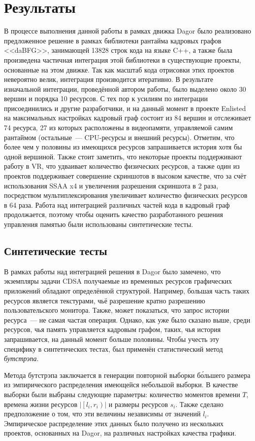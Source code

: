 \section{Результаты}
В процессе выполнения данной работы в рамках движка Dagor было реализовано предложенное решение в рамках библиотеки рантайма кадровых графов <<daBFG>>, занимающей 13828 строк кода на языке C++, а также была произведена частичная интеграция этой библиотеки в существующие проекты, основанные на этом движке.
Так как масштаб кода отрисовки этих проектов невероятно велик, интеграция производится итеративно.
В результате изначальной интеграции, проведённой автором работы, было выделено около 30 вершин и порядка 10 ресурсов.
С тех пор к усилиям по интеграции присоединились и другие разработчики, и на данный момент в проекте Enlisted на максимальных настройках кадровый граф состоит из 84 вершин и отслеживает 74 ресурса, 27 из которых расположены в видеопамяти, управляемой самим рантаймом (остальные~--- CPU-ресурсы и внешний ресурсы).
Отметим, что более чем у половины из имеющихся ресурсов запрашивается история хотя бы одной вершиной.
Также стоит заметить, что некоторые проекты поддерживают работу в VR, что удваивает количество физических ресурсов, а также один из проектов поддерживает совершение скриншотов в высоком качестве, что за счёт использования SSAA x4 и увеличения разрешения скриншота в 2 раза, посредством мультиплексирования увеличивает количество физических ресурсов в 64 раза.
Работа над интеграцией различных частей кода в кадровый граф продолжается, поэтому чтобы оценить качество разработанного решения управления памятью были использованы синтетические тесты.

\subsection{Синтетические тесты}
В рамках работы над интеграцией решения в Dagor было замечено, что экземпляры задачи CDSA получаемые из временных ресурсов графических приложений обладают определённой структурой.
Например, большая часть таких ресурсов является текстурами, чьё разрешение кратно разрешению пользовательского монитора.
Также, может показаться, что запрос истории ресурса~--- не самая частая операция.
Однако, как уже было сказано выше, среди ресурсов, чья память управляется кадровым графом, таких, чья история запрашивается, на данный момент больше половины.
Чтобы учесть эту специфику в синтетических тестах, был применён статистический метод \textit{бутстрэпа}.

Метода бутстрэпа заключается в генерации повторной выборки б\'ольшего размера из эмпирического распределения имеющейся небольшой выборки.
В качестве выборки были выбраны следующие параметры: количество моментов времени $T$, времена жизни ресурсов $\left|\left[l_i, r_i\right)\right|$ и размеры ресурсов $s_i$.
Также сделано предположение о том, что эти величины независимы от значений $l_i$.
Эмпирическое распределение этих данных было получено из нескольких проектов, основанных на Dagor, на различных настройках качества графики.

